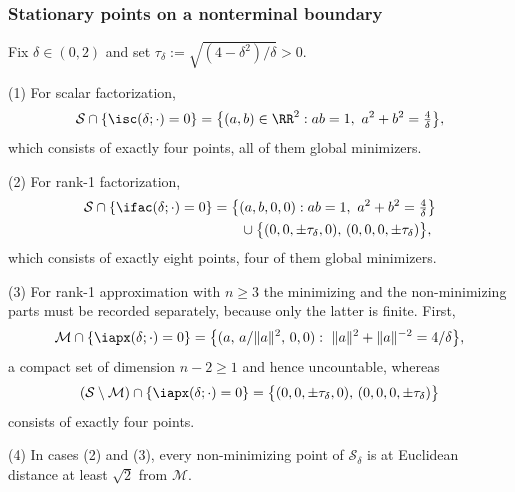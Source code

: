 \documentclass{article}
\begin{document}
\subsubsection{Stationary points on a nonterminal boundary}
\label{subsec:levelwise_stationary_slices}

\begin{lemma}
\label{lem:levelwise_stationary_slices}
Fix $\delta\in(0,2)$ and set $\tau_\delta:=\sqrt{(4-\delta^2)/\delta}>0$.

(1) For scalar factorization,
\begin{align}
    \mathcal S\cap\{\isc(\delta;\cdot)=0\}
    =
    \bigl\{(a,b)\in\RR^2: ab=1,\ a^2+b^2=\tfrac4\delta\bigr\},
\end{align}
which consists of exactly four points, all of them global minimizers.

(2) For rank-1 factorization,
\begin{align}
    \mathcal S\cap\{\ifac(\delta;\cdot)=0\}
    &=
    \bigl\{(a,b,0,0): ab=1,\ a^2+b^2=\tfrac4\delta\bigr\}
    \notag\\
    &\qquad\cup
    \bigl\{(0,0,\pm\tau_\delta,0),\,(0,0,0,\pm\tau_\delta)\bigr\},
    \label{eq:fac_slice}
\end{align}
which consists of exactly eight points, four of them global minimizers.

(3) For rank-1 approximation with $n\ge3$ the minimizing and the
non-minimizing parts must be recorded separately, because only the latter is
finite. First,
\begin{align}
    \mathcal M\cap\{\iapx(\delta;\cdot)=0\}
    =
    \bigl\{(a,\,a/\|a\|^2,\,0,0):\ \|a\|^2+\|a\|^{-2}=4/\delta\bigr\},
    \label{eq:apx_minimizer_slice}
\end{align}
a compact set of dimension $n-2\ge1$ and hence uncountable, whereas
\begin{align}
    (\mathcal S\setminus\mathcal M)\cap\{\iapx(\delta;\cdot)=0\}
    =
    \bigl\{(0,0,\pm\tau_\delta,0),\,(0,0,0,\pm\tau_\delta)\bigr\}
    \label{eq:apx_nonmin_slice}
\end{align}
consists of exactly four points.

(4) In cases (2) and (3), every non-minimizing point of $\mathcal S_\delta$ is at
Euclidean distance at least $\sqrt2$ from $\mathcal M$.
\end{lemma}
\end{document}

